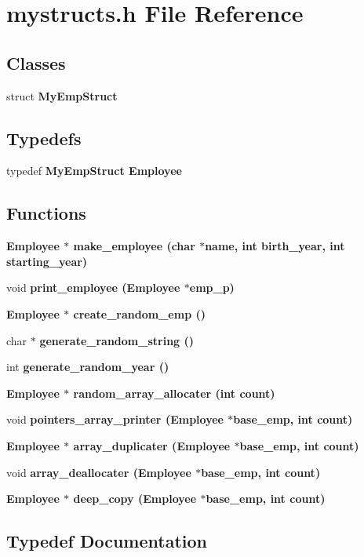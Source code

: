 \section{mystructs.h File Reference}
\label{mystructs_8h}
\subsection*{Classes}
\begin{CompactItemize}
\item 
struct \bf{My\-Emp\-Struct}
\end{CompactItemize}
\subsection*{Typedefs}
\begin{CompactItemize}
\item 
typedef \bf{My\-Emp\-Struct} \bf{Employee}
\end{CompactItemize}
\subsection*{Functions}
\begin{CompactItemize}
\item 
\bf{Employee} $\ast$ \bf{make\_\-employee} (char $\ast$name, int birth\_\-year, int starting\_\-year)
\item 
void \bf{print\_\-employee} (\bf{Employee} $\ast$emp\_\-p)
\item 
\bf{Employee} $\ast$ \bf{create\_\-random\_\-emp} ()
\item 
char $\ast$ \bf{generate\_\-random\_\-string} ()
\item 
int \bf{generate\_\-random\_\-year} ()
\item 
\bf{Employee} $\ast$ \bf{random\_\-array\_\-allocater} (int count)
\item 
void \bf{pointers\_\-array\_\-printer} (\bf{Employee} $\ast$base\_\-emp, int count)
\item 
\bf{Employee} $\ast$ \bf{array\_\-duplicater} (\bf{Employee} $\ast$base\_\-emp, int count)
\item 
void \bf{array\_\-deallocater} (\bf{Employee} $\ast$base\_\-emp, int count)
\item 
\bf{Employee} $\ast$ \bf{deep\_\-copy} (\bf{Employee} $\ast$base\_\-emp, int count)
\end{CompactItemize}


\subsection{Typedef Documentation}
